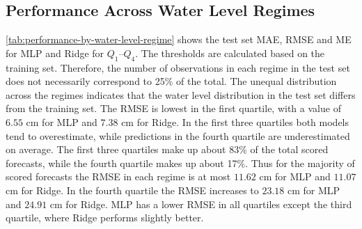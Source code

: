 \subsection{Performance Across Water Level Regimes}
\autoref{tab:performance-by-water-level-regime} shows the test set \ac{MAE}, \ac{RMSE} and \ac{ME} for \ac{MLP} and Ridge for $Q_1$--$Q_4$. The thresholds are calculated based on the training set. Therefore, the number of observations in each regime in the test set does not necessarily correspond to 25\% of the total. The unequal distribution across the regimes indicates that the water level distribution in the test set differs from the training set. The \ac{RMSE} is lowest in the first quartile, with a value of $6.55$ cm for \ac{MLP} and $7.38$ cm for Ridge. In the first three quartiles both models tend to overestimate, while predictions in the fourth quartile are underestimated on average. The first three quartiles make up about 83\% of the total scored forecasts, while the fourth quartile makes up about 17\%. Thus for the majority of scored forecasts the \ac{RMSE} in each regime is at most $11.62$ cm for \ac{MLP} and $11.07$ cm for Ridge. In the fourth quartile the \ac{RMSE} increases to $23.18$ cm for \ac{MLP} and $24.91$ cm for Ridge. \ac{MLP} has a lower \ac{RMSE} in all quartiles except the third quartile, where Ridge performs slightly better.
\begin{table}[htbp]
  \centering
  
  \caption{Test \ac{MAE}, \ac{RMSE}, and \ac{ME} by water level regime for \ac{MLP} and Ridge. The $Q_1$--$Q_4$ bounds are derived from training measurements. N counts scored forecast values.}\label{tab:performance-by-water-level-regime}
\end{table}

